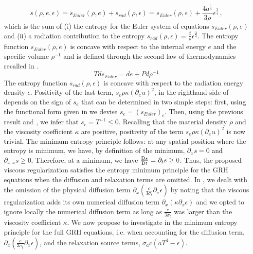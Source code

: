 \documentclass[review]{elsarticle}
\begin{document}
%
\begin{equation}\label{eq:ent_equ}
s( \rho, e, \epsilon) = s_{Euler}(\rho, e) + s_{rad}(\rho, \epsilon) = s_{Euler}(\rho, e)+ \frac{4a^{\tfrac{1}{4}}}{3\rho} \epsilon^{\tfrac{3}{4}} \, ,
\end{equation}
%
which is the sum of (i) the entropy for the Euler system of equations $s_{Euler}(\rho, e)$ and (ii) a radiation contribution to the entropy $s_{rad}(\rho,\epsilon)=\tfrac{\beta}{\rho} \epsilon^\frac{3}{4}$. 
The entropy function $s_{Euler}(\rho, e)$ is concave with respect to the internal energy $e$ and the specific volume $\rho^{-1}$ and is defined through the second law of thermodynamics recalled in .
%
\begin{equation}\label{eq:scn-law-th}
Tds_{Euler} = de + P d \rho^{-1}
\end{equation}
%
The entropy function $s_{rad}(\rho,\epsilon)$ is concave with respect to the radiation energy density $\epsilon$. Positivity of the last term, $s_e \rho \kappa (\partial_x u)^2$, in the righthand-side of  depends on the sign of $s_e$ that can be determined in two simple steps: first, using the functional form given in  we devise $s_e = (s_{Euler})_e$. Then, using the previous result and , we infer that $s_e = T^{-1} \leq 0$. Recalling that the material density $\rho$ and the viscosity coefficient $\kappa$ are positive, positivity of the term $s_e \rho \kappa (\partial_x u)^2$ is now trivial.
%
The minimum entropy principle follows: at any spatial position where the entropy is minimum, we have, by definition of the minimum, $\partial_x s =0$ and $\partial_{x,x} s \geq 0$. Therefore, at a minimum, we have $\frac{\textrm{D} s}{\textrm{D} t}=\partial_t s \geq 0$. Thus, the proposed viscous regularization satisfies the entropy minimum principle for the GRH equations when the diffusion and relaxation terms are omitted. In \cite{our_jcp_radhy_paper}, we dealt with the omission of the physical diffusion term $\partial_x( \tfrac{c}{3 \sigma_t} \partial_x \epsilon)$ by noting that the viscous regularization adds its own numerical diffusion term $\partial_x \left( \kappa \partial_x \epsilon \right)$ and we opted to ignore locally the numerical diffusion term as long as $\frac{c}{3 \sigma_t}$ was larger than the viscosity coefficient $\kappa$. 
%
We now propose to investigate in  the minimum entropy principle for the full GRH equations, i.e. when accounting for the diffusion term, $\partial_x \left( \frac{c}{3 \sigma_t} \partial_x \epsilon \right)$, and the relaxation source terms, $\sigma_a c \left( a T^4 - \epsilon \right)$.
%
\end{document}
